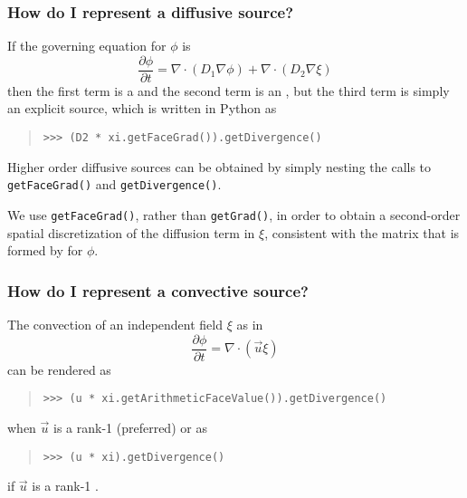                 \subsubsection{How do I represent a diffusive source?}
                    If the governing equation for $\phi$ is
                    \[
                        \frac{\partial \phi}{\partial t} 
                        = \nabla\cdot\left( D_1 \nabla \phi\right)
                        + \nabla\cdot\left( D_2 \nabla \xi\right)
                    \]
                    then the first term is a  and the second term 
                    is an , but the third term is 
                    simply an explicit source, which is written in Python as
                    \begin{quote}
\begin{verbatim}
>>> (D2 * xi.getFaceGrad()).getDivergence()
\end{verbatim}
                    \end{quote}
                    Higher order diffusive sources can be obtained by
                    simply nesting the calls to \verb+getFaceGrad()+
                    and \verb+getDivergence()+.
                    \begin{reSTadmonition}[Note]
                        We use \verb|getFaceGrad()|, rather than
                        \verb|getGrad()|, in order to obtain a
                        second-order spatial discretization of the
                        diffusion term in $\xi$, consistent with the
                        matrix that is formed by
                         for $\phi$.
                    \end{reSTadmonition}

                \subsubsection{How do I represent a convective source?}
                    The convection of an independent field $\xi$ as in
                    \[
                        \frac{\partial \phi}{\partial t} 
                        = \nabla\cdot
                        \left(
                            \vec{u} \xi
                        \right)
                    \]
                    can be rendered as
                    \begin{quote}
\begin{verbatim}
>>> (u * xi.getArithmeticFaceValue()).getDivergence()
\end{verbatim}
                    \end{quote}
                    when $\vec{u}$ is a rank-1  
                    (preferred) or as
                    \begin{quote}
\begin{verbatim}
>>> (u * xi).getDivergence()
\end{verbatim}
                    \end{quote}
                    if $\vec{u}$ is a rank-1 .


